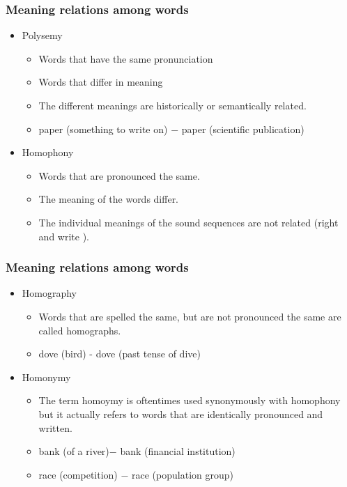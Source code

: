 \documentclass[12pt, table]{beamer}
\begin{document}
\begin{frame}
\frametitle{Meaning relations among words}
\begin{itemize}
\item Polysemy
\begin{itemize}
\item Words that have the same pronunciation 
\item Words that differ in meaning
\item The different meanings are historically or semantically related.
\item paper (something to write on) $-$ paper (scientific publication)
\end{itemize}
\item Homophony
\begin{itemize}
\item Words that are pronounced the same.
\item The meaning of the words differ. 
\item The individual meanings of the sound sequences are not related (right  and write ).
\end{itemize}
\end{itemize}
\end{frame}

\begin{frame}
\frametitle{Meaning relations among words}
\begin{itemize}
\item Homography
\begin{itemize}
\item Words that are spelled the same, but are not pronounced the same are called homographs.
\item dove  (bird) - dove  (past tense of dive)
\end{itemize}
\item Homonymy
\begin{itemize}
\item The term homoymy is oftentimes used synonymously with homophony but it actually refers to words that are identically pronounced and written.
\item bank  (of a river)$-$ bank  (financial institution)
\item race (competition) $-$ race (population group)
\end{itemize}
\end{itemize}
\end{frame}
\end{document}

